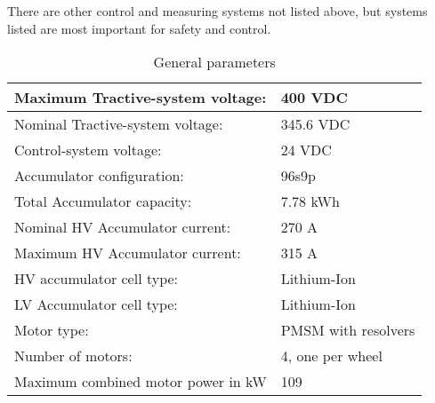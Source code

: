 There are other control and measuring systems not listed above, but systems listed are most important for safety and control.  

\iffalse
\begin{itemize}
\item Short description of the system’s concept 
\item Rough Schematic (blocks) showing all parts affected with the electrical systems and function of the tractive-system
\item No detailed wiring
\item Additionally, fill out the following table, replacing the values with your specifications:
\end{itemize}
\fi

\begin{table}[H]
	\centering
	\caption{General parameters}
	\begin{tabularx}{\textwidth}{|X|X|}
		\hline
		Maximum Tractive-system voltage: & 400 VDC  \\[\TableSize]
		\hline Nominal Tractive-system voltage: & 345.6 VDC\\[\TableSize]
		\hline
		Control-system voltage: & 24 VDC \\[\TableSize]
		\hline
		Accumulator configuration: & 96s9p \\[\TableSize]
		\hline
		Total Accumulator capacity: & 7.78 kWh\\[\TableSize]
		\hline
		Nominal HV Accumulator current: & 270 A \\[\TableSize]
		\hline
		Maximum HV Accumulator current: & 315 A \\[\TableSize]
		\hline
		HV accumulator cell type: & Lithium-Ion  \\[\TableSize]
		\hline
		LV Accumulator cell type: & Lithium-Ion \\[\TableSize]
		\hline
		Motor type: & PMSM with resolvers \\[\TableSize]
		\hline
		Number of motors: &  4, one per wheel \\[\TableSize]
		\hline
		Maximum combined motor power in kW & 109 \\[\TableSize]
		\hline
	\end{tabularx}%
	\label{tab:system-general}%
\end{table}%

